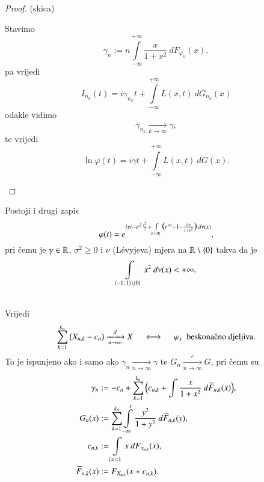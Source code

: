 \begin{proof}{(skica)}
\begin{enumerate}
        Stavimo
        \begin{equation*}
            \gamma_n := n \int\limits_{-\infty}^{+ \infty} \frac{x}{1 + x^2} \: d F_{\varphi_n} (x),
        \end{equation*}
        pa vrijedi
        \begin{equation*}
            I_{n_k} (t) = i \gamma_{n_k} t + \int\limits_{-\infty}^{+\infty} L(x, t) \: d G_{n_k} (x)
        \end{equation*}
        odakle vidimo
        \begin{equation*}
            \gamma_{n_k} \xrightarrow[k \to \infty]{} \gamma,
        \end{equation*}
        te vrijedi
        \begin{equation*}
            \ln \varphi (t) = i \gamma t + \int\limits_{-\infty}^{+\infty} L(x, t) \: d G (x).
        \end{equation*}
    \end{enumerate}
\end{proof}

Postoji i drugi zapis
\begin{equation}    \label{jed:20.17}
    \varphi (t) = e^{ i \gamma t - \sigma^2 \frac{t^2}{2} + \int\limits_{ \mathbb{R} \setminus \{0\}} \big( e^{itx} - 1 - \frac{itx}{1 + x^2} \big) \: d \nu (x) },
\end{equation}
pri \v cemu je $\gamma \in \mathbb{R}$, $\sigma^2 \geq 0$ i $\nu$ (L\' evyjeva) mjera na $\mathbb{R} \setminus \{0\}$ takva da je
\begin{equation*}
    \int\limits_{\langle {-1}, \: {1} \rangle \setminus \{0\}} x^2 \: d \nu (x) < +\infty.
\end{equation*}

\begin{tm}    \label{tm:20.18}
    \quad\\
    Vrijedi
    \begin{equation*}
        \suma{k = 1}{k_n} \big( X_{n, k} - c_n \big) \xrightarrow[n \to \infty]{d} X \quad \iff \quad \varphi_x \; \textnormal{ beskona\v cno djeljiva}.
    \end{equation*}
    To je ispunjeno ako i samo ako $\gamma_n \xrightarrow[n \to \infty]{} \gamma$ te $G_n \xrightarrow[n \to \infty]{c} G$, pri \v cemu su
    \begin{equation*}   %
        \begin{aligned}
            \gamma_n &:= -c_n + \suma{k = 1}{k_n} \Big( c_{n, k} + \int \frac{x}{1 + x^2} \: d \widetilde{F}_{n, k} (x) \Big),\\
            G_n (x) &:= \suma{k = 1}{k_n} \int\limits_{-\infty}^x \frac{y^2}{1 + y^2} \: d \widetilde{F}_{n, k}(y),\\
            c_{n, k} &:= \int\limits_{|x| < 1} x \: d F_{x_{n, k}}(x),\\
            \widetilde{F}_{n, k} (x) &:= F_{X_{n, k}} (x + c_{n, k}).
        \end{aligned}
    \end{equation*}
\end{tm}
